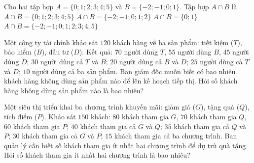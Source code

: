 \begin{ex}%
	Cho hai tập hợp $A=\{0;1;2;3;4;5\}$ và $B=\{-2;-1;0;1\}$. Tập hợp $A\cap B$ là
	\choice
		{$A\cap B=\{0;1;2;3;4;5\}$}
		{$A\cap B=\{-2;-1;0;1;2\}$}
		{\True $A\cap B=\{0;1\}$}
		{$A\cap B=\{-2;-1;0;1;2;3;4;5\}$}
\end{ex}

\begin{bt}%
	Một công ty tài chính khảo sát $120$ khách hàng về ba sản phẩm: tiết kiệm ($T$), bảo hiểm ($B$), đầu tư ($D$). Kết quả: $70$ người dùng $T$, $55$ người dùng $B$, $45$ người dùng $D$; $30$ người dùng cả $T$ và $B$; $20$ người dùng cả $B$ và $D$; $25$ người dùng cả $T$ và $D$; $10$ người dùng cả ba sản phẩm. Ban giám đốc muốn biết có bao nhiêu khách hàng không dùng sản phẩm nào để lên kế hoạch tiếp thị. Hỏi số khách hàng không dùng sản phẩm nào là bao nhiêu?
	
\end{bt}

\begin{bt}%
	Một siêu thị triển khai ba chương trình khuyến mãi: giảm giá ($G$), tặng quà ($Q$), tích điểm ($P$). Khảo sát $150$ khách: $80$ khách tham gia $G$, $70$ khách tham gia $Q$, $60$ khách tham gia $P$; $40$ khách tham gia cả $G$ và $Q$; $35$ khách tham gia cả $Q$ và $P$; $30$ khách tham gia cả $G$ và $P$; $15$ khách tham gia cả ba chương trình. Ban quản lý cần biết số khách tham gia ít nhất hai chương trình để dự trù quà tặng. Hỏi số khách tham gia ít nhất hai chương trình là bao nhiêu?
	
\end{bt}

